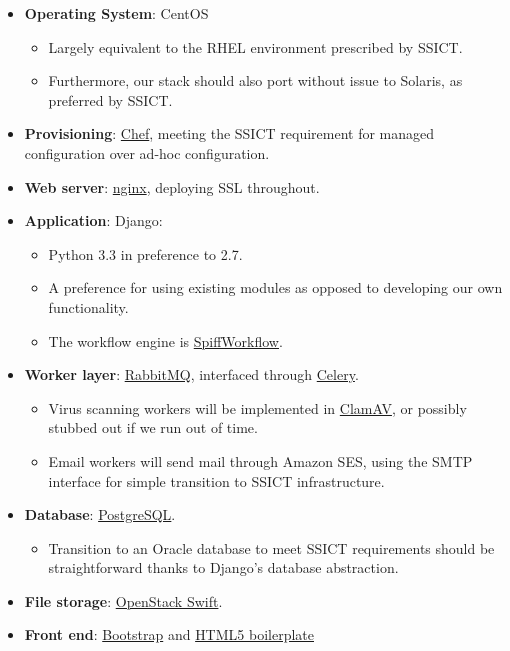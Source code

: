 \documentclass[12pt,a4paper,twosided]{article}
\begin{document}
\begin{itemize}
\itemsep1pt\parskip0pt
\item
  \textbf{Operating System}: CentOS

  \begin{itemize}
  \itemsep1pt\parskip0pt
  \item
    Largely equivalent to the RHEL environment prescribed by SSICT.
  \item
    Furthermore, our stack should also port without issue to Solaris, as
    preferred by SSICT.
  \end{itemize}
\item
  \textbf{Provisioning}: \href{http://www.opscode.com/chef/}{Chef},
  meeting the SSICT requirement for managed configuration over ad-hoc
  configuration.
\item
  \textbf{Web server}: \href{http://nginx.org/en}{nginx}, deploying SSL
  throughout.
\item
  \textbf{Application}: Django:

  \begin{itemize}
  \itemsep1pt\parskip0pt
  \item
    Python 3.3 in preference to 2.7.
  \item
    A preference for using existing modules as opposed to developing our
    own functionality.
  \item
    The workflow engine is
    \href{https://github.com/knipknap/SpiffWorkflow}{SpiffWorkflow}.
  \end{itemize}
\item
  \textbf{Worker layer}: \href{http://rabbitmq.com}{RabbitMQ},
  interfaced through \href{http://www.celeryproject.org/}{Celery}.

  \begin{itemize}
  \itemsep1pt\parskip0pt
  \item
    Virus scanning workers will be implemented in
    \href{http://www.clamav.net/lang/en/}{ClamAV}, or possibly stubbed
    out if we run out of time.
  \item
    Email workers will send mail through Amazon SES, using the SMTP
    interface for simple transition to SSICT infrastructure.
  \end{itemize}
\item
  \textbf{Database}: \href{http://postgresql.org}{PostgreSQL}.

  \begin{itemize}
  \itemsep1pt\parskip0pt
  \item
    Transition to an Oracle database to meet SSICT requirements should
    be straightforward thanks to Django's database abstraction.
  \end{itemize}
\item
  \textbf{File storage}: \href{http://swift.openstack.org}{OpenStack
  Swift}.
\item
  \textbf{Front end}: \href{http://getbootstrap.com/}{Bootstrap} and
  \href{http://html5boilerplate.com/}{HTML5 boilerplate}


\end{itemize}
\end{document}
